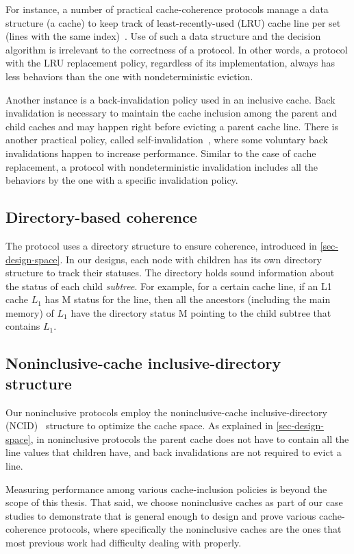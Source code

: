 For instance, a number of practical cache-coherence protocols manage a data structure (a cache) to keep track of least-recently-used (LRU) cache line per set (lines with the same index)~\cite{cacheLRU}.
Use of such a data structure and the decision algorithm is irrelevant to the correctness of a protocol.
In other words, a protocol with the LRU replacement policy, regardless of its implementation, always has less behaviors than the one with nondeterministic eviction.

Another instance is a back-invalidation policy used in an inclusive cache.
Back invalidation is necessary to maintain the cache inclusion among the parent and child caches and may happen right before evicting a parent cache line.
There is another practical policy, called self-invalidation~\cite{Ros:2012}, where some voluntary back invalidations happen to increase performance.
Similar to the case of cache replacement, a protocol with nondeterministic invalidation includes all the behaviors by the one with a specific invalidation policy.

\subsection{Directory-based coherence}
\label{sec-dir-based}

The protocol uses a directory structure to ensure coherence, introduced in \autoref{sec-design-space}.
In our designs, each node with children has its own directory structure to track their statuses.
The directory holds sound information about the status of each child \emph{subtree}.
For example, for a certain cache line, if an L1 cache $L_1$ has M status for the line, then all the ancestors (including the main memory) of $L_1$ have the directory status M pointing to the child subtree that contains $L_1$.

\subsection{Noninclusive-cache inclusive-directory structure}
\label{sec-inc-noninc}

Our noninclusive protocols employ the noninclusive-cache inclusive-directory (NCID)~\cite{Zhao:2010} structure to optimize the cache space.
As explained in \autoref{sec-design-space}, in noninclusive protocols the parent cache does not have to contain all the line values that children have, and back invalidations are not required to evict a line.

Measuring performance among various cache-inclusion policies is beyond the scope of this thesis.
That said, we choose noninclusive caches as part of our case studies to demonstrate that \hemiola{} is general enough to design and prove various cache-coherence protocols, where specifically the noninclusive caches are the ones that most previous work had difficulty dealing with properly.

